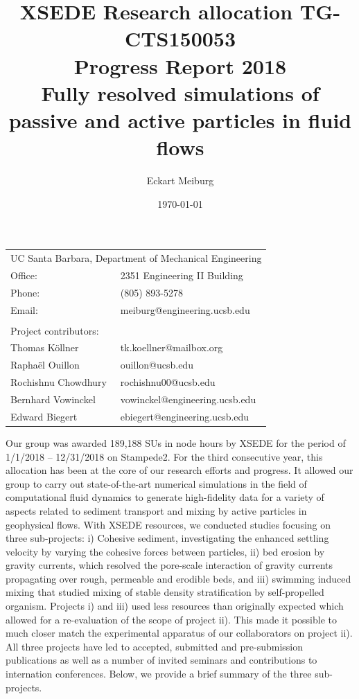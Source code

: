 \documentclass[11pt]{article}
\title{	XSEDE Research allocation TG-CTS150053 \\
	Progress Report 2018\\
	\large{Fully resolved simulations of passive and active particles in fluid flows
}} %
\author{Eckart Meiburg} %
\date{\today} %
\begin{document}
\maketitle %

\begin{center}
\begin{tabular}{l l}
\multicolumn{2}{l}{UC Santa Barbara, Department of Mechanical Engineering} \\ %
Office:          & 2351 Engineering II Building \\
Phone:           & (805) 893-5278\\
Email:           & meiburg@engineering.ucsb.edu\\
\\
\multicolumn{2}{l}{Project contributors:} \\ %
Thomas K\"{o}llner    & tk.koellner@mailbox.org\\
Rapha\"{e}l Ouillon    & ouillon@ucsb.edu\\
Rochishnu Chowdhury & rochishnu00@ucsb.edu\\
Bernhard Vowinckel & vowinckel@engineering.ucsb.edu\\
Edward Biegert     & ebiegert@engineering.ucsb.edu\\
\end{tabular}
\end{center}



Our group was awarded 189,188 SUs in node hours by XSEDE for the period of 1/1/2018 -- 12/31/2018 on Stampede2. For the third consecutive year, this allocation has been at the core of our research efforts and progress. It allowed our group to carry out state-of-the-art numerical simulations in the field of computational fluid dynamics to generate high-fidelity data for a variety of aspects related to sediment transport and mixing by active particles in geophysical flows. With XSEDE resources, we conducted studies focusing on three sub-projects: i) Cohesive sediment, investigating the enhanced settling velocity by varying the cohesive forces between particles,  ii) bed erosion by gravity currents, which resolved  the pore-scale interaction of gravity currents propagating over rough, permeable and erodible beds, and iii) swimming induced mixing that studied mixing of stable density stratification by self-propelled organism.
Projects i) and iii) used less resources than originally expected which allowed for a re-evaluation of the scope of project ii). This made it possible to much closer match the experimental apparatus of our collaborators on project ii). All three projects have led to accepted, submitted and pre-submission publications as well as a number of invited seminars and contributions to internation conferences. Below, we provide a brief summary  of the three sub-projects.
\end{document}
